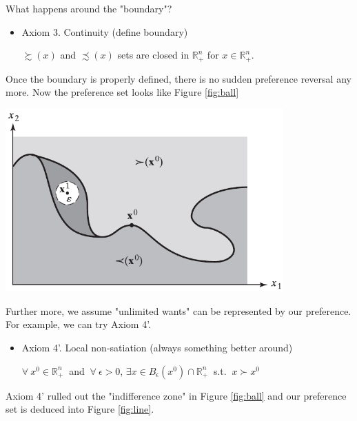 \documentclass{article}
\newcommand{\R}{\mathbb{R}}
\begin{document}
\begin{mdframed}[backgroundcolor=blue!20,linecolor=white]
What happens around the "boundary"?

\begin{itemize}
\item Axiom 3. Continuity (define boundary)

$\succsim (x)$ and $\precsim (x)$ sets are closed in $\R^n_+$ for $x \in \R^n_+ $.
\end{itemize}

Once the boundary is properly defined, there is no sudden preference reversal any more.
Now the preference set looks like Figure \ref{fig:ball}

\vspace{2mm}

{\centering
\includegraphics[width=0.8\textwidth]{1.ball}
\label{fig:ball}}

\vspace{2mm}

Further more, we assume "unlimited wants" can be represented by our preference.
For example, we can try Axiom 4'.

\begin{itemize}
\item Axiom 4'. Local non-satiation (always something better around)

$\forall \ x^0 \in \R^n_+ \ $ and $ \ \forall \ \epsilon > 0$, $\exists x 
\in B_{\epsilon}(x^0) \cap \R^n_+ \ $ s.t. $\ x \succ x^0$
\end{itemize}


Axiom 4' rulled out the "indifference zone" in Figure \ref{fig:ball} and our preference set
is deduced into Figure \ref{fig:line}.
\vspace{2mm}


\end{mdframed}
\end{document}
